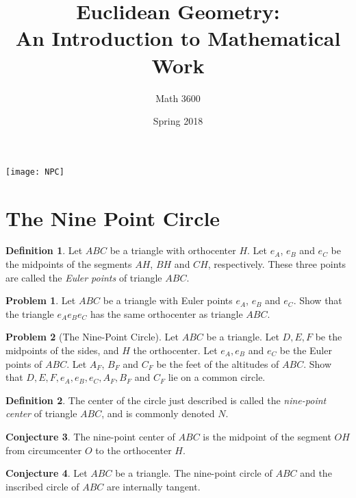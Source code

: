 \documentclass{tufte-handout}
\title{Euclidean Geometry:\\An Introduction to Mathematical Work}
\author[]{Math 3600}
\date{Spring 2018}
\theoremstyle{definition}
\newtheorem{problem}{Problem}[section]
\newtheorem{conjecture}[problem]{Conjecture}
\newtheorem*{definition}{Definition}
\begin{document}
\maketitle

\begin{marginfigure}
    \texttt{[image: NPC]}
\end{marginfigure}

\setcounter{section}{18}
\section{The Nine Point Circle}


\begin{definition} Let $ABC$ be a triangle with orthocenter $H$. Let $e_A$, $e_B$ and $e_C$ be the midpoints of the segments $AH$, $BH$ and $CH$, respectively. These three points are called the \emph{Euler points} of triangle $ABC$.
\end{definition}

\begin{problem} Let $ABC$ be a triangle with Euler points $e_A$, $e_B$ and $e_C$. Show that the triangle $e_A e_B e_C$ has the same orthocenter as triangle $ABC$.
\end{problem}

\begin{problem}[The Nine-Point Circle]\label{prob:nine-pt-circle}
Let $ABC$ be a triangle. Let $D, E, F$ be the midpoints of the sides, and $H$ the orthocenter. Let $e_A, e_B$ and $e_C$ be the Euler points of $ABC$. Let $A_F$, $B_F$ and $C_F$ be the feet of the altitudes of $ABC$. Show that $D, E, F, e_A, e_B, e_C, A_F, B_F$ and $C_F$ lie on a common circle.
\end{problem}



\begin{definition} The center of the circle just described is called the \emph{nine-point center} of triangle $ABC$, and is commonly denoted $N$.
\end{definition}

\begin{conjecture} The nine-point center of $ABC$ is the midpoint of the segment $OH$ from circumcenter $O$ to the orthocenter $H$.
\end{conjecture}

\begin{conjecture} Let $ABC$ be a triangle. The nine-point circle of $ABC$ and the inscribed circle of $ABC$ are internally tangent.
\end{conjecture}

\vfill
\end{document}
